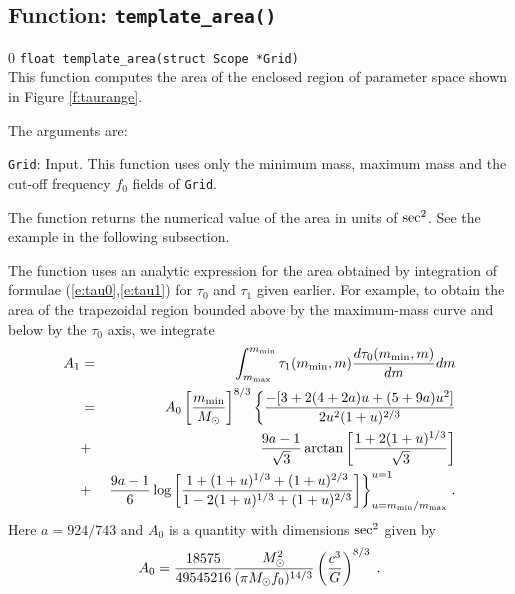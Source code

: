 \subsection{Function: {\tt template\_area()}}
\label{ss:area}
\setcounter{equation}0
{\tt float template\_area(struct Scope *Grid)}\\
This function computes
the area of the enclosed region of
parameter space shown in Figure \ref{f:taurange}.

The arguments are:
\begin{description}
\item{\tt Grid}: Input. This function uses only the minimum mass,
maximum mass and the cut-off frequency $f_0$ fields of {\tt Grid}.
\end{description}
The function returns the numerical value of the area in units of ${\rm
sec}^2$.  See the example in the following subsection.

The function uses an analytic expression for the area obtained by
integration of formulae (\ref{e:tau0},\ref{e:tau1}) for $\tau_0$
and $\tau_1$ given earlier.  For example, to obtain the area of the
trapezoidal region bounded above by the maximum-mass curve and below by
the $\tau_0$ axis, we integrate
\begin{eqnarray*}
A_{1} &=& \int_{m_{\rm max}}^{m_{\rm min}} 
\tau_1 (m_{\rm min},m) {d \tau_0(m_{\rm min},m) \over dm} dm\\
&=&
A_0 \left [ {m_{\rm min} \over M_{\odot} }\right ]^{8/3}
\biggl\{ 
{-[3 +2(4+2a)u + (5+9a)u^2 ] \over 2 u^2 (1+u)^{2/3} } \\
&+&{9a-1\over\sqrt{3} }\arctan \left [{1+2(1+u)^{1/3} \over \sqrt{3}} \right ]\\
&+& {9a-1\over 6 } \log\left [ 
{ 1 + (1+u)^{1/3} + (1+u)^{2/3}  \over  1 - 2 (1+u)^{1/3} + (1+u)^{2/3} } 
\right ]
\biggr\}_{u=m_{\rm min}/m_{\rm max}}^{u=1} \; .
\end{eqnarray*}
Here $a=924/743$ and $A_0$ is a quantity with dimensions ${\rm sec}^2$ 
given by 
\begin{eqnarray*}
A_0={18575 \over 49545216 }{ M_{\odot}^2 \over (\pi M_{\odot} f_0 )^{14/3} } 
\left ( {c^3 \over G } \right )^{8/3} \;.
\end{eqnarray*}

